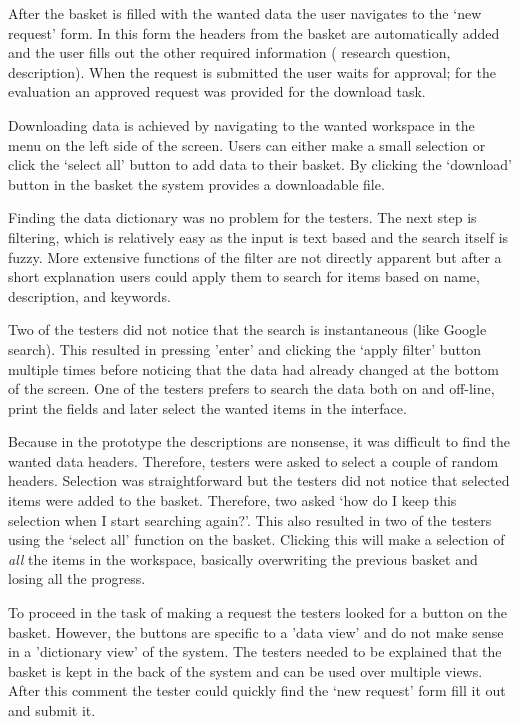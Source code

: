 After the basket is filled with the wanted data the user navigates to the `new request' form.
In this form the headers from the basket are automatically added and the user fills out the other required information (\eg{} research question, description).
When the request is submitted the user waits for approval; for the evaluation an approved request was provided for the download task.

Downloading data is achieved by navigating to the wanted workspace in the menu on the left side of the screen.
Users can either make a small selection or click the `select all' button to add data to their basket.
By clicking the `download' button in the basket the system provides a downloadable file.

Finding the data dictionary was no problem for the testers.
The next step is filtering, which is relatively easy as the input is text based and the search itself is fuzzy.
More extensive functions of the filter are not directly apparent but after a short explanation users could apply them to search for items based on name, description, and keywords.

Two of the testers did not notice that the search is instantaneous (like Google search).
This resulted in pressing 'enter' and clicking the `apply filter' button multiple times before noticing that the data had already changed at the bottom of the screen.
One of the testers prefers to search the data both on and off-line, \ie{} print the fields and later select the wanted items in the interface.

Because in the prototype the descriptions are nonsense, it was difficult to find the wanted data headers.
Therefore, testers were asked to select a couple of random headers.
Selection was straightforward but the testers did not notice that selected items were added to the basket.
Therefore, two asked `how do I keep this selection when I start searching again?'.
This also resulted in two of the testers using the `select all' function on the basket.
Clicking this will make a selection of \emph{all} the items in the workspace, basically overwriting the previous basket and losing all the progress.

To proceed in the task of making a request the testers looked for a button on the basket.
However, the buttons are specific to a 'data view' and do not make sense in a 'dictionary view' of the system.
The testers needed to be explained that the basket is kept in the back of the system and can be used over multiple views.
After this comment the tester could quickly find the `new request' form fill it out and submit it.


